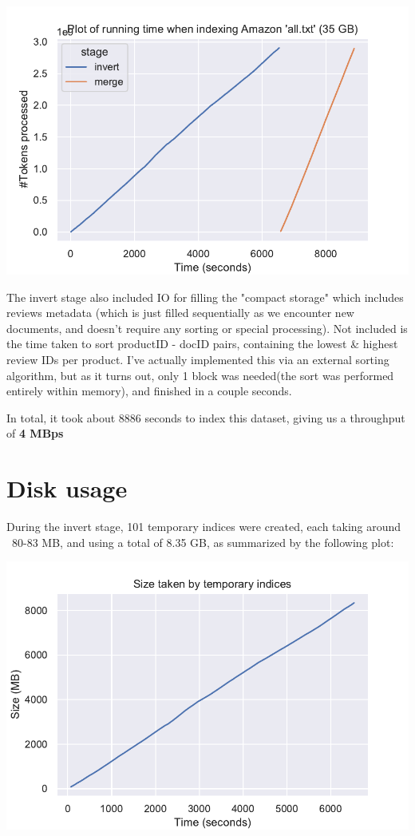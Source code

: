 \documentclass[11pt]{article}
\begin{document}
\includegraphics{runtime.pdf}


The invert stage also included IO for filling the "compact storage" which includes reviews metadata (which is just filled sequentially as
we encounter new documents, and doesn't require any sorting or special processing).
Not included is the time taken to sort productID - docID pairs, containing the lowest \& highest review IDs per product.
I've actually implemented this via an external sorting algorithm, but as it turns out, only 1 block was needed(the sort was performed entirely within memory), and finished in a couple seconds.

In total, it took about 8886 seconds to index this dataset, giving us a throughput of \textbf{4 MBps}

\section{Disk usage}

During the invert stage, 101 temporary indices were created, each taking around ~80-83 MB, and using a total of 8.35 GB, as summarized by the following plot:

\includegraphics{diskusage.pdf}
\end{document}
